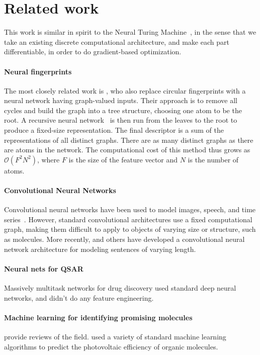 \documentclass{article}
\begin{document}
\section{Related work}

This work is similar in spirit to the Neural Turing Machine~\citep{graves2014neural}, in the sense that we take an existing discrete computational architecture, and make each part differentiable, in order to do gradient-based optimization.

\paragraph{Neural fingerprints}
The most closely related work is \citet{lusci2013deep}, who also replace circular fingerprints with a neural network having graph-valued inputs.
Their approach is to remove all cycles and build the graph into a tree structure, choosing one atom to be the root.
A recursive neural network~\citep{socher2011dynamic, socher2011semi} is then run from the leaves to the root to produce a fixed-size representation.
The final descriptor is a sum of the representations of all distinct graphs.
There are as many distinct graphs as there are atoms in the network.
The computational cost of this method thus grows as $\mathcal{O}(F^2N^2)$, where $F$ is the size of the feature vector and $N$ is the number of atoms.

\paragraph{Convolutional Neural Networks}
Convolutional neural networks have been used to model images, speech, and time series~\citep{lecun1995convolutional}.
However, standard convolutional architectures use a fixed computational graph, making them difficult to apply to objects of varying size or structure, such as molecules.
More recently, \cite{KalchbrennerACL2014} and others have developed a convolutional neural network architecture for modeling sentences of varying length.

\paragraph{Neural nets for QSAR}
\cite{ramsundar2015massively} Massively multitask networks for drug discovery
\cite{dahl2014multi, ma_qsar_2015} used standard deep neural networks, and didn't do any feature engineering.

\paragraph{Machine learning for identifying promising molecules}
\cite{Eckert2007225, bergeron2011modeling} provide reviews of the field.
\cite{tingley2014towards} used a variety of standard machine learning algorithms to predict the photovoltaic efficiency of organic molecules.
\end{document}
